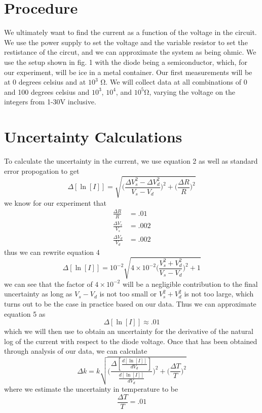 \documentclass[12pt, a4paper]{article}
\begin{document}
\section{Procedure}
	We ultimately want to find the current as a function of the voltage in the circuit. We use the power supply to set the voltage and the variable resistor to set the restistance of the circut, and we can approximate the system as being ohmic. We use the setup shown in fig. 1 with the diode being a semiconductor, which, for our experiment, will be ice in a metal container. Our first measurements will be at 0 degrees celsius and at $10^3$ \si{\ohm}. We will collect data at all combinations of 0 and 100 degrees celsius and $10^3$, $10^4$, and $10^5$\si{\ohm}, varying the voltage on the integers from 1-30V inclusive. 

\section{Uncertainty Calculations}
	To calculate the uncertainty in the current, we use equation 2 as well as standard error propogation to get
	\begin{equation}
		\Delta [\ln [I]] = \sqrt{ \Big( \frac{\Delta V_s^2 - \Delta V_d^2}{V_s - V_d} \Big)^2 + \Big( \frac{\Delta R}{R} \Big)^2 }
		\label{eq. 4}
	\end{equation}
	\linebreak
	we know for our experiment that
	\begin{align*}
		\frac{\Delta R}{R} &= .01\\
		\frac{\Delta V_s}{V_s} &= .002\\
		\frac{\Delta V_d}{V_d} &= .002
	\end{align*}
	thus we can rewrite equation 4
	\begin{equation}
		\Delta [\ln [I]] = 10^{-2} \sqrt{ 4\times 10^{-2} \Big( \frac{V_s^2 + V_d^2}{V_s - V_d} \Big)^2 + 1 }
		\label{eq. 5}
	\end{equation}
	we can see that the factor of $4\times 10^{-2}$ will be a negligible contribution to the final uncertainty as long as $V_s - V_d$ is not too small or $V_s^2 + V_d^2$ is not too large, which turns out to be the case in practice based on our data. Thus we can approximate equation 5 as
	\begin{equation*}
		\Delta [\ln [I]] \approx .01
	\end{equation*}
	which we will then use to obtain an uncertainty for the derivative of the natural log of the current with respect to the diode voltage. Once that has been obtained through analysis of our data, we can calculate
	\begin{equation}
		\Delta k = k \sqrt{ \Big( \frac{\Delta [\frac{d[\ln[I]]}{dV_d}]}{\frac{d[\ln[I]]}{dV_d}} \Big)^2 + \Big( \frac{\Delta T}{T} \Big)^2 }
		\label{eq. 6}
	\end{equation}
	where we estimate the uncertainty in temperature to be
	\begin{equation*}
		\frac{\Delta T}{T} = .01
	\end{equation*}
\end{document}

